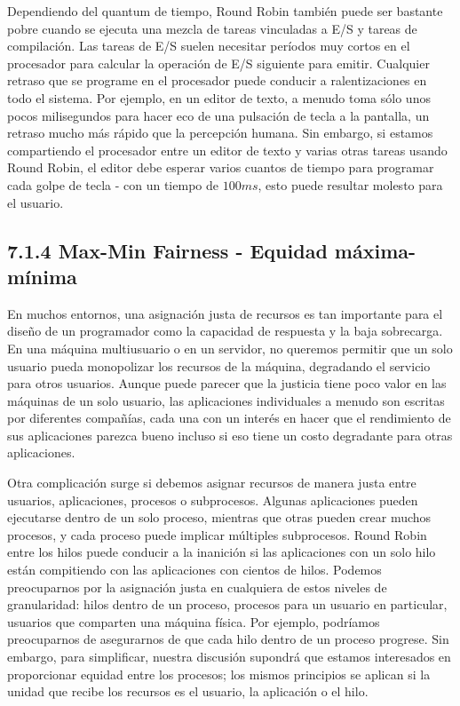 \documentclass[10pt]{book}
\begin{document}
Dependiendo del quantum de tiempo, Round Robin también puede ser bastante pobre cuando se ejecuta una mezcla de tareas vinculadas a E/S y tareas de compilación. Las tareas de E/S suelen necesitar períodos muy cortos en el procesador para calcular la operación de E/S siguiente para emitir. Cualquier retraso que se programe en el procesador puede conducir a ralentizaciones en todo el sistema. Por ejemplo, en un editor de texto, a menudo toma sólo unos pocos milisegundos para hacer eco de una pulsación de tecla a la pantalla, un retraso mucho más rápido que la percepción humana. Sin embargo, si estamos compartiendo el procesador entre un editor de texto y varias otras tareas usando Round Robin, el editor debe esperar varios cuantos de tiempo para programar cada golpe de tecla - con un tiempo de $100 ms$, esto puede resultar molesto para el usuario.

\subsection{7.1.4 Max-Min Fairness - Equidad máxima-mínima}
En muchos entornos, una asignación justa de recursos es tan importante para el diseño de un programador como la capacidad de respuesta y la baja sobrecarga. En una máquina multiusuario o en un servidor, no queremos permitir que un solo usuario pueda monopolizar los recursos de la máquina, degradando el servicio para otros usuarios. Aunque puede parecer que la justicia tiene poco valor en las máquinas de un solo usuario, las aplicaciones individuales a menudo son escritas por diferentes compañías, cada una con un interés en hacer que el rendimiento de sus aplicaciones parezca bueno incluso si eso tiene un costo degradante para otras aplicaciones.

Otra complicación surge si debemos asignar recursos de manera justa entre usuarios, aplicaciones, procesos o subprocesos. Algunas aplicaciones pueden ejecutarse dentro de un solo proceso, mientras que otras pueden crear muchos procesos, y cada proceso puede implicar múltiples subprocesos. Round Robin entre los hilos puede conducir a la inanición si las aplicaciones con un solo hilo están compitiendo con las aplicaciones con cientos de hilos. Podemos preocuparnos por la asignación justa en cualquiera de estos niveles de granularidad: hilos dentro de un proceso, procesos para un usuario en particular, usuarios que comparten una máquina física. Por ejemplo, podríamos preocuparnos de asegurarnos de que cada hilo dentro de un proceso progrese. Sin embargo, para simplificar, nuestra discusión supondrá que estamos interesados en proporcionar equidad entre los procesos; los mismos principios se aplican si la unidad que recibe los recursos es el usuario, la aplicación o el hilo.
\end{document}
